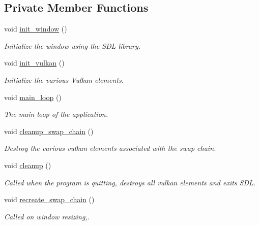 \subsection*{Private Member Functions}
\begin{DoxyCompactItemize}
\item 
void \mbox{\hyperlink{classvulkan__application_a6da121f1ee6104c981725c7c848c53a2}{init\+\_\+window}} ()
\begin{DoxyCompactList}\small\item\em Initialize the window using the S\+DL library. \end{DoxyCompactList}\item 
void \mbox{\hyperlink{classvulkan__application_a0b5da10a731df21511bee740e7222d83}{init\+\_\+vulkan}} ()
\begin{DoxyCompactList}\small\item\em Initialize the various Vulkan elements. \end{DoxyCompactList}\item 
void \mbox{\hyperlink{classvulkan__application_a718898ea3675d58ea94fb4e70df49d15}{main\+\_\+loop}} ()
\begin{DoxyCompactList}\small\item\em The main loop of the application. \end{DoxyCompactList}\item 
void \mbox{\hyperlink{classvulkan__application_a0ae5cac286b8379d17b3451dc7370790}{cleanup\+\_\+swap\+\_\+chain}} ()
\begin{DoxyCompactList}\small\item\em Destroy the various vulkan elements associated with the swap chain. \end{DoxyCompactList}\item 
void \mbox{\hyperlink{classvulkan__application_a662efdabab9edb2e63cb86850352bfc8}{cleanup}} ()
\begin{DoxyCompactList}\small\item\em Called when the program is quitting, destroys all vulkan elements and exits S\+DL. \end{DoxyCompactList}\item 
void \mbox{\hyperlink{classvulkan__application_a0190af17a510960b757dbcf037a70fa9}{recreate\+\_\+swap\+\_\+chain}} ()
\begin{DoxyCompactList}\small\item\em Called on window resizing,. \end{DoxyCompactList}\item 

\end{DoxyCompactItemize}

